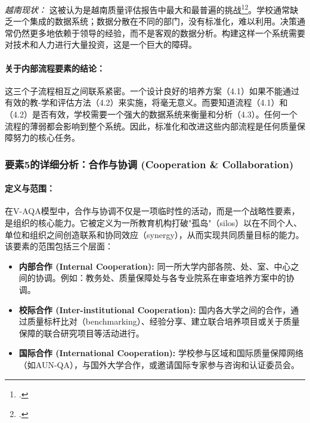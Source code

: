 \textit{越南现状：} 这被认为是越南质量评估报告中最大和最普遍的挑战\footcite{CommonFailureCriteria}\footcite{AUN-QA_Challenges_VN}。学校通常缺乏一个集成的数据系统；数据分散在不同的部门，没有标准化，难以利用。决策通常仍然更多地依赖于领导的经验，而不是客观的数据分析。构建这样一个系统需要对技术和人力进行大量投资，这是一个巨大的障碍。

\paragraph{关于内部流程要素的结论：}
这三个子流程相互之间联系紧密。一个设计良好的培养方案（4.1）如果不能通过有效的教-学和评估方法（4.2）来实施，将毫无意义。而要知道流程（4.1）和（4.2）是否有效，学校需要一个强大的数据系统来衡量和分析（4.3）。任何一个流程的薄弱都会影响到整个系统。因此，标准化和改进这些内部流程是任何质量保障努力的核心任务。



\subsubsection{要素5的详细分析：合作与协调 (Cooperation \& Collaboration)}
\label{subsubsec:thanh_to_5}

\paragraph{定义与范围：}
在V-AQA模型中，合作与协调不仅是一项临时性的活动，而是一个战略性要素，是组织的核心能力。它被定义为一所教育机构打破"孤岛"（silos）以在不同个人、单位和组织之间创造联系和协同效应（synergy），从而实现共同质量目标的能力。该要素的范围包括三个层面：
\begin{itemize}
    \item \textbf{内部合作 (Internal Cooperation):} 同一所大学内部各院、处、室、中心之间的协调。例如：教务处、质量保障处与各专业院系在审查培养方案中的协调。
    \item \textbf{校际合作 (Inter-institutional Cooperation):} 国内各大学之间的合作，通过质量标杆比对（benchmarking）、经验分享、建立联合培养项目或关于质量保障的联合研究项目等活动进行。
    \item \textbf{国际合作 (International Cooperation):} 学校参与区域和国际质量保障网络（如AUN-QA），与国外大学合作，或邀请国际专家参与咨询和认证委员会。
\end{itemize}

